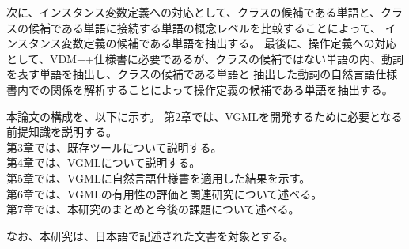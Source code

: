次に、インスタンス変数定義への対応として、クラスの候補である単語と、クラスの候補である単語に接続する単語の概念レベルを比較することによって、
インスタンス変数定義の候補である単語を抽出する。
最後に、操作定義への対応として、VDM++仕様書に必要であるが、クラスの候補ではない単語の内、動詞を表す単語を抽出し、クラスの候補である単語と
抽出した動詞の自然言語仕様書内での関係を解析することによって操作定義の候補である単語を抽出する。

本論文の構成を、以下に示す。
第2章では、VGMLを開発するために必要となる前提知識を説明する。\\
第3章では、既存ツールについて説明する。\\
第4章では、VGMLについて説明する。\\
第5章では、VGMLに自然言語仕様書を適用した結果を示す。\\
第6章では、VGMLの有用性の評価と関連研究について述べる。\\
第7章では、本研究のまとめと今後の課題について述べる。

なお、本研究は、日本語で記述された文書を対象とする。
